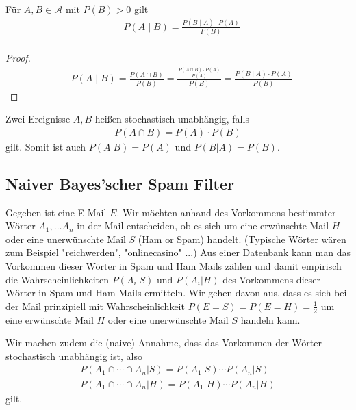 \begin{Satz}
Für $A,B \in  \mathcal{A}$ mit  $P(B) > 0$ gilt
\begin{align*}
& P(A \; | \;  B) = \frac{P(B \; | \; A) \cdot P(A)} {P(B)} \\
\end{align*}
\end{Satz}

\begin{proof}
\begin{align*}
& P(A \; | \;  B) =\frac{P(A \cap B)}{P(B)} = \frac{ \frac{P(A \cap B) \cdot P(A)}{P(A)}}{P(B)}  =  \frac{P(B \; | \; A) \cdot P(A)} {P(B)} 
\end{align*}
\end{proof}


\begin{Definition}
Zwei Ereignisse $A,B$ heißen stochastisch unabhängig, falls
\begin{align*}
P(A \cap B) = P(A) \cdot P(B)
\end{align*}
gilt.  Somit ist auch $P(A | B) = P(A)$ und $P(B  | A) = P(B)$.
\end{Definition}


\subsection{Naiver Bayes'scher Spam Filter}
Gegeben ist eine E-Mail $E$.  Wir möchten anhand des Vorkommens bestimmter Wörter $A_1, \ldots A_n$ in der Mail entscheiden, ob es sich um eine erwünschte Mail $H$ oder eine unerwünschte Mail $S$ (Ham or Spam) handelt. 
(Typische Wörter wären zum Beispiel "reichwerden",  "onlinecasino" ...)
Aus einer Datenbank kann man das Vorkommen dieser Wörter in Spam und Ham Mails zählen und damit empirisch die Wahrscheinlichkeiten $P(A_i | S)$ und $P(A_i | H) $ des Vorkommens dieser Wörter in Spam und Ham Mails ermitteln.  Wir gehen davon aus, dass es sich bei der Mail  prinzipiell mit  Wahrscheinlichkeit $P(E= S) = P(E= H)= \frac{1}{2}$  um eine erwünschte  Mail $H$ oder eine unerwünschte Mail $S$  handeln kann. 




 Wir machen zudem die (naive) Annahme, dass das Vorkommen der Wörter  stochastisch unabhängig ist, also 
\begin{align*}
P(A_1 \cap \cdots \cap A_n | S) = P(A_1 | S) \cdots P(A_n | S) \\
P(A_1 \cap \cdots \cap A_n | H) = P(A_1 | H) \cdots P(A_n | H)
\end{align*}
gilt.


